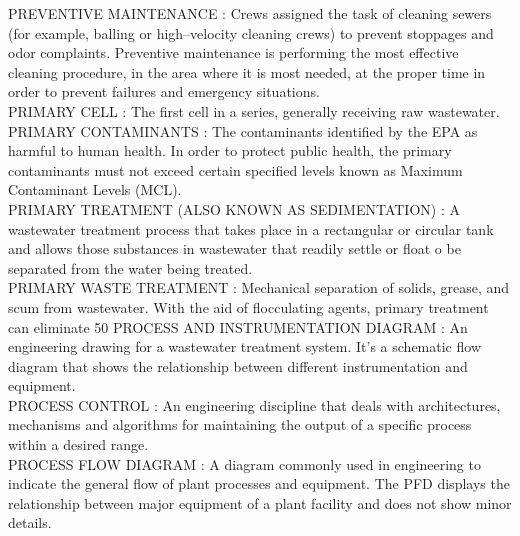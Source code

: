 \vspace{0.15cm}
PREVENTIVE MAINTENANCE :  Crews assigned the task of cleaning sewers (for example, balling or high–velocity cleaning crews) to prevent stoppages and odor complaints. Preventive maintenance is performing the most effective cleaning procedure, in the area where it is most needed, at the proper time in order to prevent failures and emergency situations. \\
\vspace{0.15cm}
PRIMARY CELL :  The first cell in a series, generally receiving raw wastewater.\\
\vspace{0.15cm}
PRIMARY CONTAMINANTS :  The contaminants identified by the EPA as harmful to human health. In order to protect public health, the primary contaminants must not exceed certain specified levels known as Maximum Contaminant Levels (MCL). \\
\vspace{0.15cm}
PRIMARY TREATMENT (ALSO KNOWN AS SEDIMENTATION) :  A wastewater treatment process that takes place in a rectangular or circular tank and allows those substances in wastewater that readily settle or float o be separated from the water being treated. \\
\vspace{0.15cm}
PRIMARY WASTE TREATMENT :   Mechanical separation of solids, grease, and scum from wastewater. With the aid of flocculating agents, primary treatment can eliminate 50%
\vspace{0.15cm}
PROCESS AND INSTRUMENTATION DIAGRAM :   An engineering drawing for a wastewater treatment system. It’s a schematic flow diagram that shows the relationship between different instrumentation and equipment.\\
\vspace{0.15cm}
PROCESS CONTROL :   An engineering discipline that deals with architectures, mechanisms and algorithms for maintaining the output of a specific process within a desired range.\\
\vspace{0.15cm}
PROCESS FLOW DIAGRAM :   A diagram commonly used in engineering to indicate the general flow of plant processes and equipment. The PFD displays the relationship between major equipment of a plant facility and does not show minor details.\\
